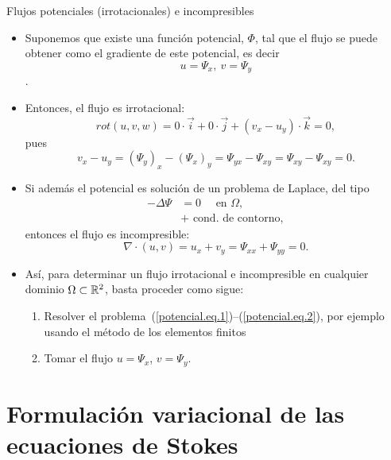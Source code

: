 \documentclass[9pt, dvipsnames]{beamer}
\begin{document}
\begin{frame}{Flujos potenciales (irrotacionales) e incompresibles}
\begin{itemize}
\item Suponemos que existe una función potencial, $\Phi$, tal que
  el flujo se puede obtener como el gradiente de este potencial, es decir
  $$u=\Psi_x, \ v=\Psi_y$$.
  \item Entonces, el flujo es \alert{irrotacional}:
  $$
  rot(u,v,w) = 0\cdot \vec{i} + 0\cdot \vec j + (v_x - u_y)\cdot \vec k = 0,
  $$
  pues
  $$
  v_x - u_y = (\Psi_{y})_x - (\Psi_{x})_y = \Psi_{yx} - \Psi_{xy} = \Psi_{xy} - \Psi_{xy} = 0.
  $$
\item Si además el potencial es solución de un problema de Laplace, del tipo
  \begin{align}
    \label{potencial.eq.1}
    -\Delta \Psi &= 0 \quad \text{ en } \Omega, \\
    \label{potencial.eq.2}
    &+ \text{ cond. de contorno},
  \end{align}
  entonces el flujo es \alert{incompresible}:
  $$
  \nabla\cdot(u,v) = u_x + v_y =\Psi_{xx} + \Psi_{yy} =  0.
  $$
\item Así, para determinar un flujo irrotacional e incompresible en
  cualquier dominio $\Omega\subset{\mathbb R}^2$, basta proceder como sigue:
  \begin{enumerate}
  \item Resolver el
    problema~(\ref{potencial.eq.1})--(\ref{potencial.eq.2}), por
    ejemplo usando el método de los elementos finitos
  \item Tomar el flujo $u=\Psi_x$, $v=\Psi_y$.
  \end{enumerate}


\end{itemize}

\end{frame}

\section{Formulación variacional de las ecuaciones de Stokes}
\end{document}
